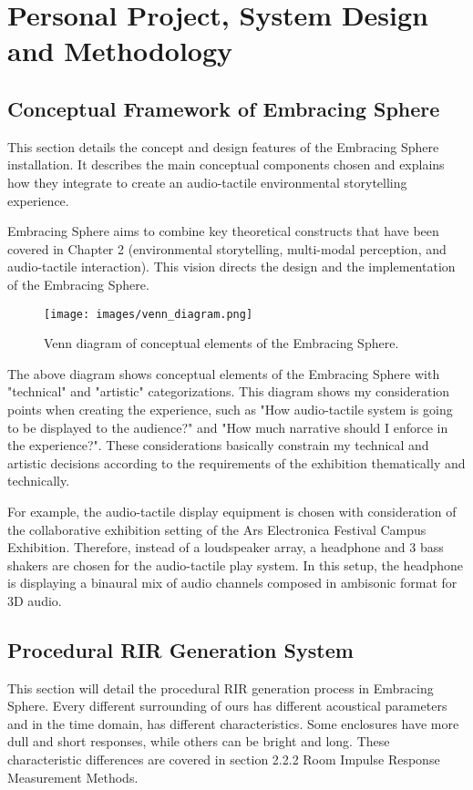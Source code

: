 \chapter{Personal Project, System Design and Methodology}
    \section{Conceptual Framework of Embracing Sphere}
        This section details the concept and design features of the Embracing Sphere installation. It describes the main conceptual components chosen and explains how they integrate to create an audio-tactile environmental storytelling experience.\par

        Embracing Sphere aims to combine key theoretical constructs that have been covered in Chapter 2 (environmental storytelling, multi-modal perception, and audio-tactile interaction). This vision directs the design and the implementation of the Embracing Sphere.\par

        \begin{figure}[H]
            \centering
            \texttt{[image: images/venn\_diagram.png]}
            \caption{Venn diagram of conceptual elements of the Embracing Sphere.}
            \label{fig:VENN}
        \end{figure}        

        The above diagram shows conceptual elements of the Embracing Sphere with "technical" and "artistic" categorizations. This diagram shows my consideration points when creating the experience, such as "How audio-tactile system is going to be displayed to the audience?" and "How much narrative should I enforce in the experience?". These considerations basically constrain my technical and artistic decisions according to the requirements of the exhibition thematically and technically.\par

        For example, the audio-tactile display equipment is chosen with consideration of the collaborative exhibition setting of the Ars Electronica Festival Campus Exhibition. Therefore, instead of a loudspeaker array, a headphone and 3 bass shakers are chosen for the audio-tactile play system. In this setup, the headphone is displaying a binaural mix of audio channels composed in ambisonic format for 3D audio.\par
        \section{Procedural RIR Generation System}
            This section will detail the procedural RIR generation process in Embracing Sphere. Every different surrounding of ours has different acoustical parameters and in the time domain, has different characteristics. Some enclosures have more dull and short responses, while others can be bright and long. These characteristic differences are covered in section 2.2.2 Room Impulse Response Measurement Methods.\par

